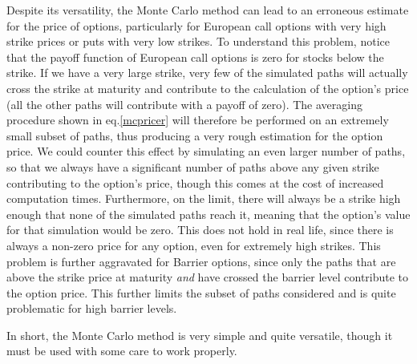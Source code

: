 Despite its versatility, the Monte Carlo method can lead to an erroneous estimate for the price of options, particularly for European call options with very high strike prices or puts with very low strikes. To understand this problem, notice that the payoff function of European call options is zero for stocks below the strike. If we have a very large strike, very few of the simulated paths will actually cross the strike at maturity and contribute to the calculation of the option's price (all the other paths will contribute with a payoff of zero). The averaging procedure shown in eq.\eqref{mcpricer} will therefore be performed on an extremely small subset of paths, thus producing a very rough estimation for the option price.
We could counter this effect by simulating an even larger number of paths, so that we always have a significant number of paths above any given strike contributing to the option's price, though this comes at the cost of increased computation times.
Furthermore, on the limit, there will always be a strike high enough that none of the simulated paths reach it, meaning that the option's value for that simulation would be zero. This does not hold in real life, since there is always a non-zero price for any option, even for extremely high strikes.
This problem is further aggravated for Barrier options, since only the paths that are above the strike price at maturity \emph{and} have crossed the barrier level contribute to the option price. This further limits the subset of paths considered and is quite problematic for high barrier levels.

In short, the Monte Carlo method is very simple and quite versatile, though it must be used with some care to work properly.

